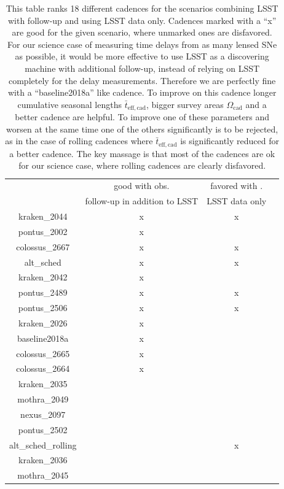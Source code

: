 \begin{table}
\centering
\begin{tabular}{c|c|c|c}
& good with obs.   &  favored with . \\
& follow-up in addition to LSST  & LSST data only \\
\hline
kraken\_2044 & x & x  \\
\hline
pontus\_2002 & x &    \\
\hline
colossus\_2667 & x & x   \\
\hline
alt\_sched & x & x    \\
\hline
kraken\_2042  & x &   \\
\hline
pontus\_2489 & x & x  \\
\hline
pontus\_2506 & x & x \\
\hline
kraken\_2026 & x &   \\
\hline
baseline2018a & x &      \\
\hline
colossus\_2665 & x &    \\
\hline
colossus\_2664 & x &     \\
\hline
kraken\_2035 &  &     \\
\hline
mothra\_2049 & &   \\
\hline
nexus\_2097 &  &   \\
\hline
pontus\_2502 &&    \\
\hline
alt\_sched\_rolling & &x    \\
\hline
kraken\_2036 & &   \\
\hline
mothra\_2045 & &   \\
\end{tabular}
\caption{This table ranks 18 different cadences for the scenarios combining LSST with follow-up and using LSST data only. Cadences marked with a ``x'' are good for the given scenario, where unmarked ones are disfavored. For our science case of measuring time delays from as many lensed SNe as possible, it would be more effective to use LSST as a discovering machine with additional follow-up, instead of relying on LSST completely for the delay measurements. Therefore we are perfectly fine with a ``baseline2018a'' like cadence. To improve on this cadence longer cumulative seasonal lengths $\bar{t}_\mathrm{eff,cad}$, bigger survey areas $\Omega_\mathrm{cad}$ and a better cadence are helpful. To improve one of these parameters and worsen at the same time one of the others significantly is to be rejected, as in the case of rolling cadences where $\bar{t}_\mathrm{eff,cad}$ is significantly reduced for a better cadence. The key massage is that most of the cadences are ok for our science case, where rolling cadences are clearly disfavored.}
\label{tab: favoured strategies}
\end{table}
%
\FloatBarrier
